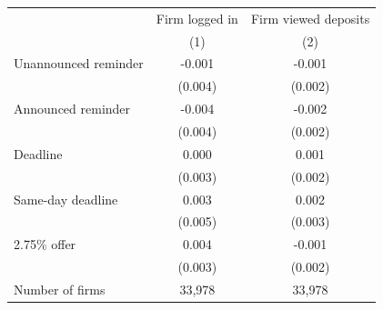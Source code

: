 \begin{tabular}[t]{lcc}
\toprule
  & Firm logged in & Firm viewed deposits\\
 & (1) & (2)\\
\midrule
Unannounced reminder & -0.001 & -0.001\\
 & (0.004) &  (0.002)\\
Announced reminder & -0.004 & -0.002\\
 & (0.004) & (0.002)\\
Deadline & 0.000 & 0.001\\
 & (0.003) &  (0.002)\\
Same-day deadline & 0.003 & 0.002\\
 & (0.005) & (0.003)\\
2.75\% offer & 0.004 & -0.001\\
 & (0.003) & (0.002)\\
\midrule
Number of firms & 33,978 & 33,978\\
\bottomrule
\end{tabular}
